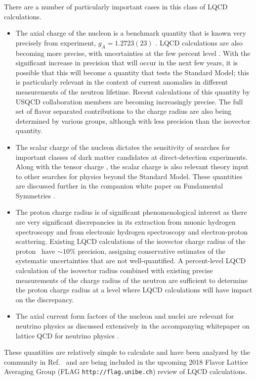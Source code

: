 There are a number of particularly important cases in this class of LQCD calculations. 
\begin{itemize}
	\item The axial charge of the nucleon is a benchmark quantity that is known very precisely from experiment, $g_A=1.2723(23)$ \cite{Patrignani:2016xqp}. LQCD calculations are also becoming more precise, with uncertainties at the few percent level  \cite{Bhattacharya:2016zcn,Yoon:2016jzj,Chang:2018uxx,Gupta:2018qil}. With the significant increase in precision that will occur in the next few years, it is possible that this will  become a quantity that tests the Standard Model; this is particularly relevant in the context of current anomalies in different measurements of the neutron lifetime. Recent calculations of this quantity by USQCD collaboration members are becoming increasingly precise. The full set of flavor separated contributions to the charge radius are also being determined by various groups, although with less precision than the isovector quantity.
	
	\item The scalar charge of the nucleon dictates the sensitivity of searches for important classes of dark matter candidates at direct-detection experiments. Along with the tensor charge \cite{Gupta:2018lvp}, the scalar charge \cite{Shanahan:2016pla}  is also relevant theory input to other searches for physics beyond the Standard Model. These quantities are discussed further in the companion white paper on Fundamental Symmetries \cite{Cirigliano:2019jig}.
	
	\item The proton charge radius is  of significant phenomenological interest as there are very significant discrepancies in its extraction from muonic hydrogen spectroscopy  and from electronic hydrogen spectroscopy and electron-proton scattering. Existing LQCD calculations of the isovector charge radius of the
proton~\cite{Capitani:2015sba,Hasan:2017wwt,Alexandrou:2017ypw,Ishikawa:2018rew,Detmold:2018ptb,Alexandrou:2018sjm}  have $\sim10$\% precision, assigning conservative estimates of the systematic uncertainties that are not well-quantified. A  percent-level  LQCD calculation of the isovector radius combined with existing precise measurements of the charge radius of the neutron are sufficient to determine the proton charge radius at a level where LQCD calculations will  have impact on the discrepancy. 
	
	\item The axial current form factors of the nucleon and nuclei are relevant for neutrino physics as discussed extensively in the  accompanying whitepaper on lattice QCD for neutrino physics \cite{Kronfeld:2019nfb}.
\end{itemize} 
These quantities are relatively simple to calculate  and have been analyzed by the community in Ref.~\cite{Lin:2017snn} and  are being included in the upcoming 2018 Flavor Lattice Averaging Group (FLAG {\tt http://flag.unibe.ch})
review of LQCD calculations.

